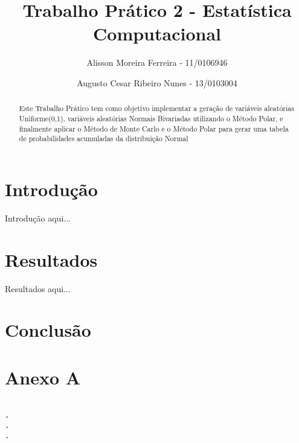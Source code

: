 \documentclass[a4paper,12pt]{article}
\title{Trabalho Prático 2 - Estatística Computacional }
\author{Alisson Moreira Ferreira - 11/0106946 \\
	\and
	Augusto Cesar Ribeiro Nunes - 13/0103004}
\begin{document}
\maketitle

\begin{abstract}
Este Trabalho Prático tem como objetivo implementar a geração de variáveis aleatórias Uniforme(0,1),  variáveis aleatórias Normais Bivariadas utilizando o Método Polar, e finalmente aplicar o Método de Monte Carlo e o Método Polar para gerar uma tabela de probabilidades acumuladas da distribuição Normal
\end{abstract}


\section{Introdução}

Introdução aqui...

\section{Resultados}

Resultados aqui...

\section{Conclusão}



\section*{Anexo A}


\begin{verbatim}

.
.
.
\end{verbatim}
\end{document}
